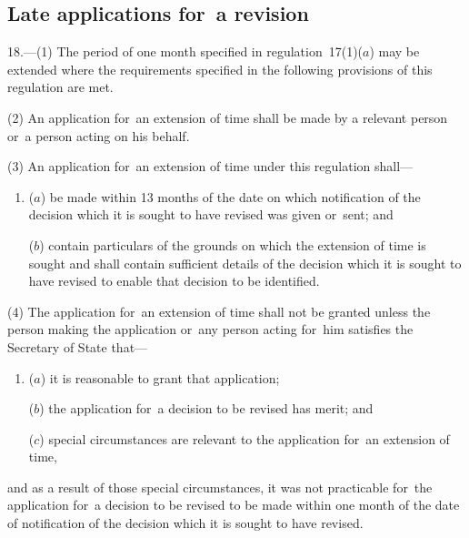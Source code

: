 \documentclass[a4paper,12pt]{article}
\begin{document}

\subsection[18. Late applications for~a revision]{Late applications for~a revision}

18.—(1) The period of one month specified in regulation~17(1)($a$) may be extended where the requirements specified in the following provisions of this regulation are met.

(2) An application for~an extension of time shall be made by a relevant person or~a person acting on his behalf.

(3) An application for~an extension of time under this regulation shall---
\begin{enumerate}\item[]
($a$) be made within 13 months of the date on which notification of the decision which it is sought to have revised was given or~sent; and

($b$) contain particulars of the grounds on which the extension of time is sought and shall contain sufficient details of the decision which it is sought to have revised to enable that decision to be identified.
\end{enumerate}

(4) The application for~an extension of time shall not be granted unless the person making the application or~any person acting for~him satisfies the Secretary of State that---
\begin{enumerate}\item[]
($a$) it is reasonable to grant that application;

($b$) the application for~a decision to be revised has merit; and

($c$) special circumstances are relevant to the application for~an extension of time,
\end{enumerate}
and as a result of those special circumstances, it was not practicable for~the application for~a decision to be revised to be made within one month of the date of notification of the decision which it is sought to have revised.
\end{document}
